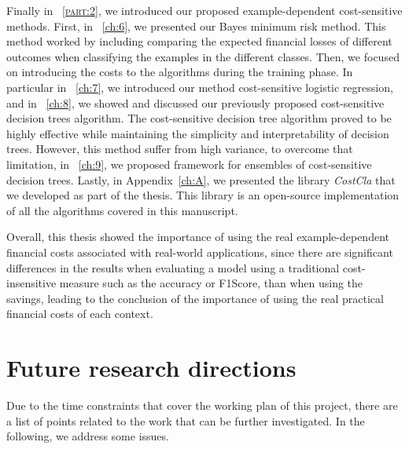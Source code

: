 Finally in \partname{~\textsc{\ref{part:2}}}, we introduced our proposed example-dependent 
cost-sensitive methods. First, in \chaptername{~\ref{ch:6}}, we presented our Bayes minimum risk 
method. This method worked by including comparing the expected financial losses of different 
outcomes when classifying the examples in the different classes. Then, we focused on introducing the 
costs to the algorithms during the training phase. In particular in \chaptername{~\ref{ch:7}}, we 
introduced our method cost-sensitive logistic regression, and in \chaptername{~\ref{ch:8}}, we 
showed and discussed our previously proposed cost-sensitive decision trees algorithm. 
The cost-sensitive decision tree algorithm proved to be highly effective while maintaining the 
simplicity and interpretability of decision trees. However, this method suffer from high variance, 
to overcome that limitation, in \chaptername{~\ref{ch:9}}, we proposed framework for 
ensembles of cost-sensitive decision trees. Lastly, in Appendix~\ref{ch:A}, we presented the 
library \mbox{\textit{CostCla}} that we developed as part of the thesis. This library is an 
open-source implementation of all the algorithms covered in this manuscript. 
  
Overall, this thesis showed the importance of using the real example-dependent financial 
costs associated with real-world applications, since there are significant differences in the 
results when evaluating a model using a traditional cost-insensitive measure such as the accuracy 
or F1Score,  than when using the savings, leading to the conclusion of the importance of using the 
real practical financial costs of each context.

\newpage
\section{Future research directions}

Due to the time constraints that cover the working plan of this project, there are a
list of points related to the work that can be further investigated. In the following, we
address some issues. 

